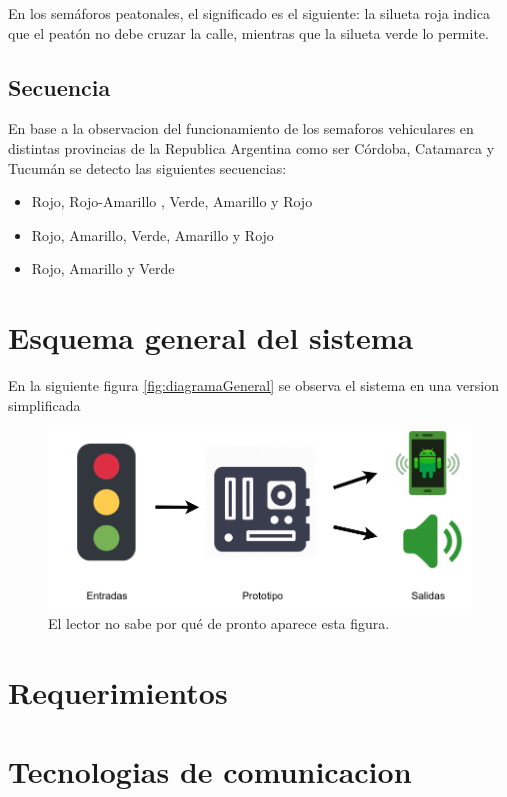 En los semáforos peatonales, el significado es el siguiente: la silueta roja indica que el peatón no debe cruzar la calle, mientras que la silueta verde lo permite.

\subsection{Secuencia}
En base a la observacion del funcionamiento de los semaforos vehiculares en distintas provincias de la Republica Argentina como ser Córdoba, Catamarca y Tucumán se detecto las siguientes secuencias:

\begin{itemize}
\item Rojo, Rojo-Amarillo , Verde, Amarillo y Rojo
\item Rojo, Amarillo, Verde, Amarillo y Rojo
\item Rojo, Amarillo y Verde
\end{itemize}

\section{Esquema general del sistema}
 En la  siguiente figura \ref{fig:diagramaGeneral} se observa  el sistema en una  version simplificada
\begin{figure}[h]
	\centering
	\includegraphics[scale=.4]{./Figures/diagramaGeneral.png}
	\caption{El lector no sabe por qué de pronto aparece esta figura.}
	\label{fig:questionMark}
\end{figure}

\section{Requerimientos}

\section{Tecnologias de comunicacion}